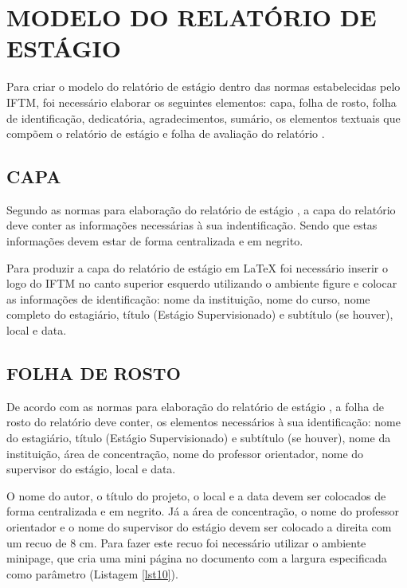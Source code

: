 \newpage
\section{MODELO DO RELATÓRIO DE ESTÁGIO}
\indent Para criar o modelo do relatório de estágio dentro das normas estabelecidas pelo IFTM, foi necessário elaborar os seguintes elementos: capa,  folha de rosto, folha de identificação, dedicatória, agradecimentos, sumário, os elementos textuais que compõem o relatório de estágio e folha de avaliação do relatório \cite{manualEstagio}.

\subsection{CAPA}
Segundo as normas para elaboração do relatório de estágio \cite{manualEstagio}, a capa do relatório deve conter as informações necessárias à sua indentificação. Sendo que estas informações devem estar de forma centralizada e em negrito.

Para produzir a capa do relatório de estágio em LaTeX foi necessário inserir o logo do IFTM no canto superior esquerdo utilizando o ambiente figure e colocar as informações de identificação: nome da instituição, nome do curso, nome completo do estagiário, título (Estágio Supervisionado) e subtítulo (se houver), local e data.

\subsection{FOLHA DE ROSTO}
De acordo com as normas para elaboração do relatório de estágio \cite{manualEstagio}, a folha de rosto do relatório deve conter, os elementos necessários à sua identificação: nome do estagiário, título (Estágio Supervisionado) e subtítulo (se houver), nome da instituição, área de concentração, nome do professor orientador, nome do supervisor do estágio, local e data.

O nome do autor, o título do projeto, o local e a data devem ser colocados de forma centralizada e em negrito. Já a área de concentração, o nome do professor orientador e o nome do supervisor do estágio devem ser colocado a direita com um recuo de 8 cm. Para fazer este recuo foi necessário utilizar o ambiente minipage, que cria uma mini página no documento com a largura especificada como parâmetro (Listagem \ref{lst10}).\\

\newpage


